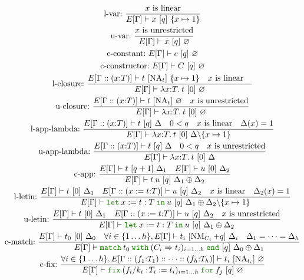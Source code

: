 \documentclass[a4paper,fleqn]{article}
\newcommand{\kwlet}{\mbox{\color{mygreen}\ttfamily let}}
\newcommand{\kwin}{\mbox{\color{mygreen}\ttfamily in}}
\newcommand{\kwmatch}{\mbox{\color{mygreen}\ttfamily match}}
\newcommand{\kwwith}{\mbox{\color{mygreen}\ttfamily with}}
\newcommand{\kwend}{\mbox{\color{mygreen}\ttfamily end}}
\newcommand{\kwfix}{\mbox{\color{mygreen}\ttfamily fix}}
\newcommand{\kwfor}{\mbox{\color{mygreen}\ttfamily for}}
\newcommand{\lamT}[3]{\lambda #1\mathord{:}#2.\:#3}
\newcommand{\lassum}[2]{(#1\mathord{:}#2)}
\newcommand{\ldef}[3]{(#1:=#2\mathord{:}#3)}
\newcommand{\letin}[3]{\kwlet\:#1:=#2\:\kwin\:#3}
\newcommand{\match}[4]{\kwmatch\:#1\:\kwwith\:(#2 \Rightarrow #3)_{#4}\:\kwend}
\newcommand{\fixT}[5]{\kwfix\:(#1:\!#2 := #3)_{#4}\:\kwfor\:#5}
\DeclareMathOperator{\NA}{NA}
\DeclareMathOperator{\NM}{NM}
\begin{document}
\begin{gather*}
  \text{l-var:}~
    \dfrac{
      \text{$x$ is linear}
    }{
      E[\Gamma] \vdash x ~[q]~\{x\mapsto1\}
    } \\
  \text{u-var:}~
    \dfrac{
      \text{$x$ is unrestricted}
    }{
      E[\Gamma] \vdash x ~[q]~\varnothing
    } \\
  \text{c-constant:}~
    E[\Gamma] \vdash c ~[q]~\varnothing \\
  \text{c-constructor:}~
    E[\Gamma] \vdash C ~[q]~\varnothing \\
  \text{l-closure:}~
    \dfrac{
      E[\Gamma::\lassum{x}{T}] \vdash t ~[\NA_t]~\{ x\mapsto1 \} \quad
      \text{$x$ is linear} \quad
    }{
      E[\Gamma] \vdash \lamT{x}{T}{t} ~[0]~\varnothing
    } \\
  \text{u-closure:}~
    \dfrac{
      E[\Gamma::\lassum{x}{T}] \vdash t ~[\NA_t]~\varnothing \quad
      \text{$x$ is unrestricted}
    }{
      E[\Gamma] \vdash \lamT{x}{T}{t} ~[0]~\varnothing
    } \\
  \text{l-app-lambda:}~
    \dfrac{
      E[\Gamma::\lassum{x}{T}] \vdash t ~[q]~\Delta \quad
      0 < q \quad
      \text{$x$ is linear} \quad
      \Delta(x) = 1
    }{
      E[\Gamma] \vdash \lamT{x}{T}{t} ~[0]~ \Delta \backslash \{x\mapsto1\}
    } \\
  \text{u-app-lambda:}~
    \dfrac{
      E[\Gamma::\lassum{x}{T}] \vdash t ~[q]~\Delta \quad
      0 < q \quad
      \text{$x$ is unrestricted}
    }{
      E[\Gamma] \vdash \lamT{x}{T}{t} ~[0]~\Delta
    } \\
  \text{c-app:}~
    \dfrac{
      E[\Gamma] \vdash t ~[q+1]~\Delta_1 \quad
      E[\Gamma] \vdash u ~[0]~\Delta_2
    }{
      E[\Gamma] \vdash t\:u ~[q]~ \Delta_1 \oplus \Delta_2
    } \\
  \text{l-letin:}~
    \dfrac{
      E[\Gamma] \vdash t ~[0]~\Delta_1 \quad
      E[\Gamma::\ldef{x}{t}{T}] \vdash u ~[q]~\Delta_2 \quad
      \text{$x$ is linear} \quad
      \Delta_2(x) = 1
    }{
      E[\Gamma] \vdash \letin{x}{t:T}{u} ~[q]~ \Delta_1 \oplus \Delta_2 \backslash \{x\mapsto1\}
    } \\
  \text{u-letin:}~
    \dfrac{
      E[\Gamma] \vdash t ~[0]~\Delta_1 \quad
      E[\Gamma::\ldef{x}{t}{T}] \vdash u ~[q]~\Delta_2 \quad
      \text{$x$ is unrestricted}
    }{
      E[\Gamma] \vdash \letin{x}{t:T}{u} ~[q]~ \Delta_1 \oplus \Delta_2
    } \\
  \text{c-match:}~
    \dfrac{
      E[\Gamma] \vdash t_0 ~[0]~\Delta_0 \quad
      \forall i\in\{1\ldots h\}, E[\Gamma] \vdash t_i ~[\NM_{C_i}+q]~\Delta_i \quad
      \Delta_1 = \cdots = \Delta_h
    }{
      E[\Gamma] \vdash \match{t_0}{C_i}{t_i}{i=1\ldots h} ~[q]~ \Delta_0 \oplus \Delta_1
    } \\
  \text{c-fix:}~
    \dfrac{
      \forall i\in\{1\ldots h\}, E[\Gamma::\lassum{f_1}{T_1}::\dotsb::\lassum{f_h}{T_h}] \vdash t_i ~[\NA_{t_i}]~\varnothing
    }{
      E[\Gamma] \vdash \fixT{f_i/k_i}{T_i}{t_i}{i=1\ldots h}{f_j} ~[q]~ \varnothing
    }
\end{gather*}
\end{document}
